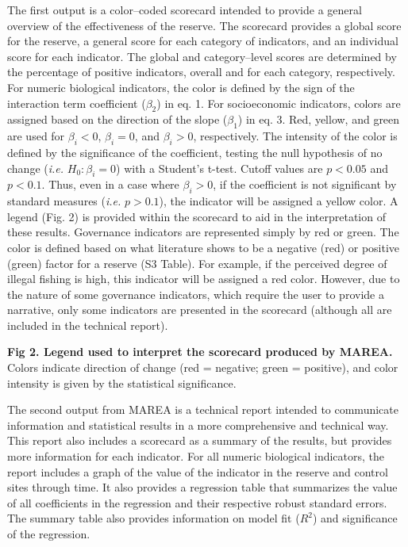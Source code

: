\documentclass[12pt,]{article}
\begin{document}
The first output is a color--coded scorecard intended to provide a
general overview of the effectiveness of the reserve. The scorecard
provides a global score for the reserve, a general score for each
category of indicators, and an individual score for each indicator. The
global and category--level scores are determined by the percentage of
positive indicators, overall and for each category, respectively. For
numeric biological indicators, the color is defined by the sign of the
interaction term coefficient (\(\beta_2\)) in eq. 1. For socioeconomic
indicators, colors are assigned based on the direction of the slope
(\(\beta_1\)) in eq. 3. Red, yellow, and green are used for
\(\beta_i<0\), \(\beta_i = 0\), and \(\beta_i>0\), respectively. The
intensity of the color is defined by the significance of the
coefficient, testing the null hypothesis of no change (\emph{i.e.}
\(H_0: \beta_i = 0\)) with a Student's t-test. Cutoff values are
\(p < 0.05\) and \(p < 0.1\). Thus, even in a case where
\(\beta_i > 0\), if the coefficient is not significant by standard
measures (\emph{i.e. } \(p>0.1\)), the indicator will be assigned a
yellow color. A legend (Fig. 2) is provided within the scorecard to aid
in the interpretation of these results. Governance indicators are
represented simply by red or green. The color is defined based on what
literature shows to be a negative (red) or positive (green) factor for a
reserve (S3 Table). For example, if the perceived degree of illegal
fishing is high, this indicator will be assigned a red color. However,
due to the nature of some governance indicators, which require the user
to provide a narrative, only some indicators are presented in the
scorecard (although all are included in the technical report).

\textbf{Fig 2. Legend used to interpret the scorecard produced by
MAREA.} Colors indicate direction of change (red = negative; green =
positive), and color intensity is given by the statistical significance.

The second output from MAREA is a technical report intended to
communicate information and statistical results in a more comprehensive
and technical way. This report also includes a scorecard as a summary of
the results, but provides more information for each indicator. For all
numeric biological indicators, the report includes a graph of the value
of the indicator in the reserve and control sites through time. It also
provides a regression table that summarizes the value of all
coefficients in the regression and their respective robust standard
errors. The summary table also provides information on model fit
(\(R^2\)) and significance of the regression.
\end{document}

